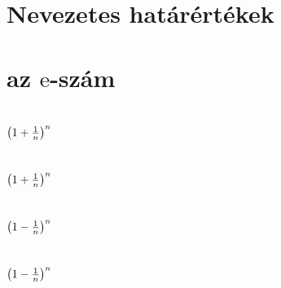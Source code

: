








\begin{spacing}{1.2}

\section*{Nevezetes határértékek} \label{DB}
\newline
{}
\newline
{}
\newpage
\section*{az $\mathrm{e}$-szám} \label{DBe}
\newline
{}
\newline
{}
\newline
{}
\vspace{0.5cm}
\newpage
\section*{${ \left( 1+\frac{1}{n} \right) }^n$} \label{DBe1}
\Fa{

}
\vspace{0.5cm}
\newpage
\section*{${ \left( 1+\frac{1}{n} \right) }^n$} \label{DBe1Mo}
\Mo{

}
\vspace{0.5cm}
\newpage
\section*{${ \left( 1-\frac{1}{n} \right) }^n$} \label{DBe2}
\Fa{

}
\vspace{0.5cm}
\newpage
\section*{${ \left( 1-\frac{1}{n} \right) }^n$} \label{DBe2Mo}
\Mo{

}
\vspace{0.5cm}
\newpage

\end{spacing}
